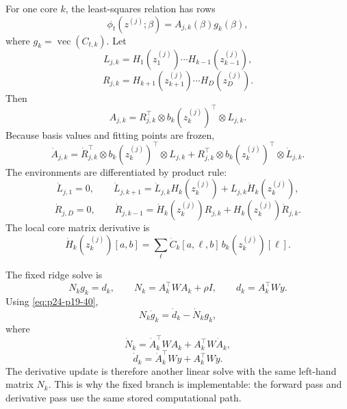 \documentclass[11pt]{article}
\numberwithin{equation}{section}
\newcommand{\vecop}{\operatorname{vec}}
\begin{document}
For one core \(k\), the least-squares relation has rows
\begin{equation}
    \phi_t(z^{(j)};\beta)=A_{j,k}(\beta)g_k(\beta),
    \label{eq:p24-p19-54}
\end{equation}
where \(g_k=\vecop(C_{t,k})\).  Let
\begin{equation}
    L_{j,k}
    =
    H_{1}(z_1^{(j)})\cdots H_{k-1}(z_{k-1}^{(j)}),
    \label{eq:p24-p19-55}
\end{equation}
\begin{equation}
    R_{j,k}
    =
    H_{k+1}(z_{k+1}^{(j)})\cdots H_D(z_D^{(j)}).
    \label{eq:p24-p19-56}
\end{equation}
Then
\begin{equation}
    A_{j,k}
    =
    R_{j,k}^{\top}\otimes b_k(z_k^{(j)})^\top\otimes L_{j,k}.
    \label{eq:p24-p19-57}
\end{equation}
Because basis values and fitting points are frozen,
\begin{equation}
    \dot A_{j,k}
    =
    \dot R_{j,k}^{\top}\otimes b_k(z_k^{(j)})^\top\otimes L_{j,k}
    +
    R_{j,k}^{\top}\otimes b_k(z_k^{(j)})^\top\otimes \dot L_{j,k}.
    \label{eq:p24-p19-58}
\end{equation}
The environments are differentiated by product rule:
\begin{equation}
    \dot L_{j,1}=0,
    \qquad
    \dot L_{j,k+1}
    =
    \dot L_{j,k}H_k(z_k^{(j)})
    +
    L_{j,k}\dot H_k(z_k^{(j)}),
    \label{eq:p24-p19-59}
\end{equation}
\begin{equation}
    \dot R_{j,D}=0,
    \qquad
    \dot R_{j,k-1}
    =
    \dot H_k(z_k^{(j)})R_{j,k}
    +
    H_k(z_k^{(j)})\dot R_{j,k}.
    \label{eq:p24-p19-60}
\end{equation}
The local core matrix derivative is
\begin{equation}
    \dot H_k(z_k^{(j)})[a,b]
    =
    \sum_{\ell}
    \dot C_k[a,\ell,b]\,b_k(z_k^{(j)})[\ell].
    \label{eq:p24-p19-61}
\end{equation}

The fixed ridge solve is
\begin{equation}
    N_k g_k=d_k,
    \qquad
    N_k=A_k^\top W A_k+\rho I,
    \qquad
    d_k=A_k^\top W y.
    \label{eq:p24-p19-62}
\end{equation}
Using \eqref{eq:p24-p19-40},
\begin{equation}
    N_k\dot g_k=\dot d_k-\dot N_k g_k,
    \label{eq:p24-p19-63}
\end{equation}
where
\begin{equation}
    \dot N_k=\dot A_k^\top W A_k+A_k^\top W\dot A_k,
    \label{eq:p24-p19-64}
\end{equation}
\begin{equation}
    \dot d_k=\dot A_k^\top W y+A_k^\top W\dot y.
    \label{eq:p24-p19-65}
\end{equation}
The derivative update is therefore another linear solve with the same
left-hand matrix \(N_k\).  This is why the fixed branch is implementable: the
forward pass and derivative pass use the same stored computational path.
\end{document}
